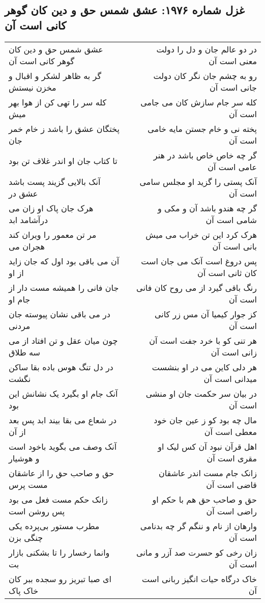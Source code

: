 \begin{center}
\section*{غزل شماره ۱۹۷۶: عشق شمس حق و دین کان گوهر کانی است آن}
\label{sec:1976}
\begin{longtable}{l p{0.5cm} r}
عشق شمس حق و دین کان گوهر کانی است آن
&&
در دو عالم جان و دل را دولت معنی است آن
\\
گر به ظاهر لشکر و اقبال و مخزن نیستش
&&
رو به چشم جان نگر کان دولت جانی است آن
\\
کله سر را تهی کن از هوا بهر میش
&&
کله سر جام سازش کان می جامی است آن
\\
پختگان عشق را باشد ز خام خمر جان
&&
پخته نی و خام جستن مایه خامی است آن
\\
تا کتاب جان او اندر غلاف تن بود
&&
گر چه خاص خاص باشد در هنر عامی است آن
\\
آنک بالایی گزیند پست باشد عشق در
&&
آنک پستی را گزید او مجلس سامی است آن
\\
هرک جان پاک او زان می درآشامد ابد
&&
گر چه هندو باشد آن و مکی و شامی است آن
\\
مر تن معمور را ویران کند هجران می
&&
هرک کرد این تن خراب می میش بانی است آن
\\
آن می باقی بود اول که جان زاید از او
&&
پس دروغ است آنک می جان است کان ثانی است آن
\\
جان فانی را همیشه مست دار از جام او
&&
رنگ باقی گیرد از می روح کان فانی است آن
\\
در می باقی نشان پیوسته جان مردنی
&&
کز جوار کیمیا آن مس زر کانی است آن
\\
چون میان عقل و تن افتاد از می سه طلاق
&&
هر تنی کو با خرد جفت است آن زانی است آن
\\
در دل تنگ هوس باده بقا ساکن نگشت
&&
هر دلی کاین می در او بنشست میدانی است آن
\\
آنک جام او بگیرد یک نشانش این بود
&&
در بیان سر حکمت جان او منشی است آن
\\
در شعاع می بقا بیند ابد پس بعد از آن
&&
مال چه بود کو ز عین جان خود معطی است آن
\\
آنک وصف می بگوید باخود است و هوشیار
&&
اهل قرآن نبود آن کس لیک او مقری است آن
\\
حق و صاحب حق را از عاشقان مست پرس
&&
زانک جام مست اندر عاشقان قاضی است آن
\\
زانک حکم مست فعل می بود پس روشن است
&&
حق و صاحب حق هم با حکم او راضی است آن
\\
مطرب مستور بی‌پرده یکی چنگی بزن
&&
وارهان از نام و ننگم گر چه بدنامی است آن
\\
وانما رخسار را تا بشکنی بازار بت
&&
زان رخی کو حسرت صد آزر و مانی است آن
\\
ای صبا تبریز رو سجده ببر کان خاک پاک
&&
خاک درگاه حیات انگیز ربانی است آن
\\
\end{longtable}
\end{center}
